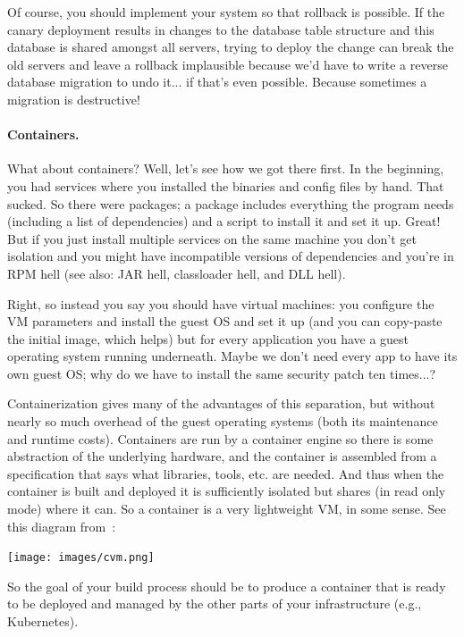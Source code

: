 \documentclass[a4paper]{report}
\begin{document}
Of course, you should implement your system so that rollback is possible. If the canary deployment results in changes to the database table structure and this database is shared amongst all servers, trying to deploy the change can break the old servers and leave a rollback implausible because we'd have to write a reverse database migration to undo it... if that's even possible. Because sometimes a migration is destructive!



\paragraph{Containers.} What about containers? Well, let's see how we got there first. In the beginning, you had services where you installed the binaries and config files by hand. That sucked. So there were packages; a package includes everything the program needs (including a list of dependencies) and a script to install it and set it up. Great! But if you just install multiple services on the same machine you don't get isolation and you might have incompatible versions of dependencies and you're in RPM hell (see also: JAR hell, classloader hell, and DLL hell).

Right, so instead you say you should have virtual machines: you configure the VM parameters and install the guest OS and set it up (and you can copy-paste the initial image, which helps) but for every application you have a guest operating system running underneath. Maybe we don't need every app to have its own guest OS; why do we have to install the same security patch ten times...?

Containerization gives many of the advantages of this separation, but without nearly so much overhead of the guest operating systems (both its maintenance and runtime costs). Containers are run by a container engine so there is some abstraction of the underlying hardware, and the container is assembled from a specification that says what libraries, tools, etc. are needed. And thus when the container is built and deployed it is sufficiently isolated but shares (in read only mode) where it can. So a container is a very lightweight VM, in some sense. See this diagram from~\cite{netappcontainer}:

\begin{center}
	\texttt{[image: images/cvm.png]}
\end{center}

So the goal of your build process should be to produce a container that is ready to be deployed and managed by the other parts of your infrastructure (e.g., Kubernetes). 
\end{document}

